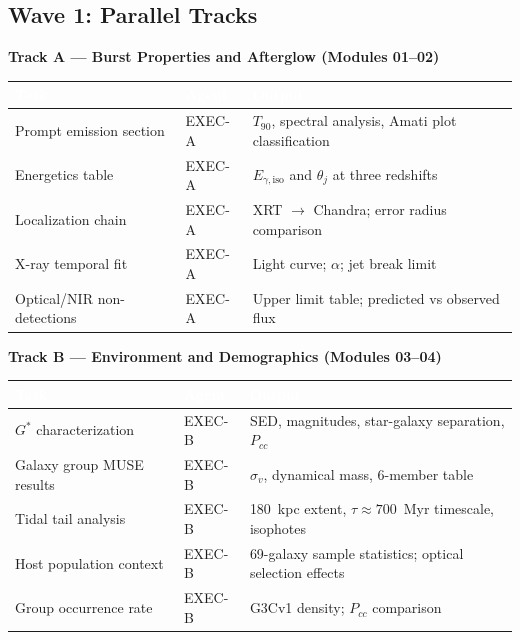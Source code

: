 \documentclass[11pt,letterpaper]{article}
\newcommand{\tableheader}[1]{\textbf{\sffamily\textcolor{white}{#1}}}
\begin{document}
\subsection{Wave 1: Parallel Tracks}

\textbf{Track A --- Burst Properties and Afterglow (Modules 01--02)}

\begin{center}
\begin{tabularx}{\textwidth}{L{3cm}C{2cm}X}
\toprule
{}
\tableheader{Task} & \tableheader{Agent} & \tableheader{Output} \\
\midrule
Prompt emission section & EXEC-A & $T_{90}$, spectral analysis, Amati plot classification \\
Energetics table & EXEC-A & $E_{\gamma,\text{iso}}$ and $\theta_j$ at three redshifts \\
Localization chain & EXEC-A & XRT $\to$ Chandra; error radius comparison \\
X-ray temporal fit & EXEC-A & Light curve; $\alpha$; jet break limit \\
Optical/NIR non-detections & EXEC-A & Upper limit table; predicted vs observed flux \\
\bottomrule
\end{tabularx}
\end{center}

\textbf{Track B --- Environment and Demographics (Modules 03--04)}

\begin{center}
\begin{tabularx}{\textwidth}{L{3cm}C{2cm}X}
\toprule
{}
\tableheader{Task} & \tableheader{Agent} & \tableheader{Output} \\
\midrule
$G^*$ characterization & EXEC-B & SED, magnitudes, star-galaxy separation, $P_{cc}$ \\
Galaxy group MUSE results & EXEC-B & $\sigma_v$, dynamical mass, 6-member table \\
Tidal tail analysis & EXEC-B & 180~kpc extent, $\tau \approx 700$~Myr timescale, isophotes \\
Host population context & EXEC-B & 69-galaxy sample statistics; optical selection effects \\
Group occurrence rate & EXEC-B & G3Cv1 density; $P_{cc}$ comparison \\
\bottomrule
\end{tabularx}
\end{center}
\end{document}
